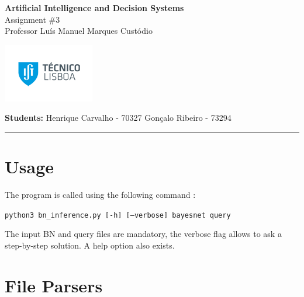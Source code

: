 \documentclass[11pt,a4paper]{article}
\begin{document}

\begin{minipage}{0.8\textwidth}
    \Large \textbf{Artificial Intelligence and Decision Systems}\vspace{0.2cm}\\
    Assignment \#3\vspace{0.2cm}\\
    \normalsize Professor Luís Manuel Marques Custódio
\end{minipage}
\begin{minipage}{0\textwidth}
    \raggedleft
    \includegraphics[scale=0.65]{ist_logo.png}
\end{minipage}

\vspace{0.2cm}
\begin{minipage}{0.8\textwidth}
    \textbf{Students:} \hspace{0.3cm}
    Henrique Carvalho - 70327 \hspace{0.3cm} Gonçalo Ribeiro -  73294

\end{minipage}

\rule{\textwidth}{1pt}


\section{Usage}
The program is called using the following command :

\vspace{4mm}
\hspace{1cm}\texttt{python3 bn\_inference.py [-h] [--verbose] bayesnet query}
\vspace{4mm}
\par
The input BN and query files are mandatory, the verbose flag allows to ask a step-by-step solution. A help option also exists.

\section{File Parsers}
\end{document}
